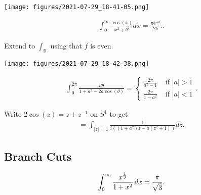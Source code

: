 \begin{solution}

\texttt{[image: figures/2021-07-29\_18-41-05.png]}

\end{solution}

\begin{exercise}[?]

\begin{align*}
\int_{0}^{\infty} \frac{\cos (x)}{x^{2}+b^{2}} d x=\frac{\pi \mathrm{e}^{-b}}{2 b} .
.\end{align*}

\end{exercise}

\begin{solution}

Extend to \(\int_{\mathbb{R}}\) using that \(f\) is even.

\texttt{[image: figures/2021-07-29\_18-42-38.png]}

\end{solution}

\begin{exercise}

\begin{align*}
\int_{0}^{2 \pi} \frac{d \theta}{1+a^{2}-2 a \cos (\theta)}
= \begin{cases}\frac{2 \pi}{a^{2}-1} & \text { if }|a|>1 \\ \frac{2 \pi}{1-a^{2}} & \text { if }|a|<1\end{cases}
.\end{align*}

\end{exercise}

\begin{solution}

Write \(2\cos(z) = z + z^{-1}\) on \(S^1\) to get
\begin{align*}
=\int_{|z|=1} \frac{1}{i\left(\left(1+a^{2}\right) z-a\left(z^{2}+1\right)\right)} d z
.\end{align*}

\end{solution}

\hypertarget{branch-cuts}{%
\subsection{Branch Cuts}\label{branch-cuts}}

\begin{exercise}[?]

\begin{align*}
\int_0^\infty {x^{1\over 3} \over 1 + x^2} \,dx= {\pi \over \sqrt 3}
.\end{align*}

\end{exercise}

